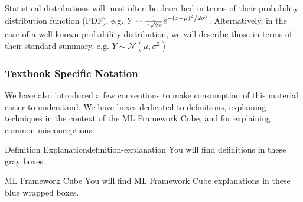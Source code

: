 Statistical distributions will most often be described in terms of their probability distribution function (PDF), e.g. $Y \sim \frac{1}{{\sigma \sqrt {2\pi } }}e^{{{ - \left( {x - \mu } \right)^2 } \mathord{\left/ {\vphantom {{ - \left( {y - \mu } \right)^2 } {2\sigma ^2 }}} \right. \kern-\nulldelimiterspace} {2\sigma ^2 }}}$. Alternatively, in the case of a well known probability distribution, we will describe those in terms of their standard summary, e.g. $Y \sim \mathcal{N}(\mu, \sigma^2)$

\subsubsection{Textbook Specific Notation}
We have also introduced a few conventions to make consumption of this material easier to understand. We have boxes dedicated to definitions, explaining techniques in the context of the ML Framework Cube, and for explaining common misconceptions: \newline

\begin{definition}{Definition Explanation}{definition-explanation}
You will find definitions in these gray boxes.
\end{definition}

\begin{mlcube}{ML Framework Cube}
You will find ML Framework Cube explanations in these blue wrapped boxes.
\end{mlcube}

